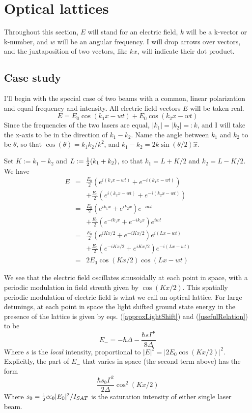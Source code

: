 \documentclass[aps,twocolumn,prb,floatfix,amsmath,amssymb,groupedaddress]{revtex4}
\begin{document}
\section{Optical lattices}
Throughout this section, $E$ will stand for an electric field, $k$ will be a k-vector or k-number, and $w$ will be an angular frequency.  I will drop arrows over vectors, and the juxtaposition of two vectors, like $kx$, will indicate their dot product.

\subsection{Case study}
I'll begin with the special case of two beams with a common, linear polarization and equal frequency and intensity.  All electric field vectors $E$ will be taken real.
\[E = E_0 \cos(k_1x-wt) + E_0 \cos(k_2x-wt)\]
Since the frequencies of the two lasers are equal, $|k_1| = |k_2|=:k$, and I will take the x-axis to be in the direction of $k_1-k_2$.  Name the angle between $k_1$ and $k_2$ to be $\theta$, so that $\cos(\theta) = k_1k_2 / k^2$, and $k_1-k_2 = 2k\sin(\theta/2) \hat{x}$.

Set $K:=k_1-k_2$ and $L:={\frac{1}{2}}(k_1+k_2)$, so that $k_1 = L+K/2$ and $k_2=L-K/2$.  We have
\begin{eqnarray}
E & = & \frac{E_0}{2} \left(e^{i(k_1x-wt)}+e^{-i(k_1x-wt)}\right)  \nonumber\\
& &  + \frac{E_0}{2} \left(e^{i(k_2x-wt)}+e^{-i(k_2x-wt)}\right)  \nonumber\\
& = & \frac{E_0}{2} \left(e^{ik_1x} + e^{ik_2x}\right) e^{-iwt}  \nonumber\\
& & + \frac{E_0}{2} \left(e^{-ik_1x} + e^{-ik_2x}\right)e^{iwt}  \nonumber\\
& = & \frac{E_0}{2} \left(e^{iKx/2} + e^{-iKx/2}\right) e^{i(Lx-wt)}  \nonumber\\
& & + \frac{E_0}{2} \left(e^{-iKx/2} + e^{iKx/2}\right)e^{-i(Lx-wt)}  \nonumber\\
& = & 2E_0\cos(Kx/2)\cos(Lx-wt)
\label{lattice1d}
\end{eqnarray}

We see that the electric field oscillates sinusoidally at each point in space, with a periodic modulation in field strenth given by $\cos(Kx/2)$.  This spatially periodic modulation of electric field is what we call an optical lattice.  For large detunings, at each point in space the light shifted ground state energy in the presence of the lattice is given by eqs. (\ref{approxLightShift}) and (\ref{usefulRelation}) to be
\[E_- = -\hbar\Delta -\frac{\hbar s \Gamma^2}{8\Delta}\]
Where $s$ is the \textit{local} intensity, proportional to $|E|^2 = |2E_0 \cos(Kx/2)|^2$.  Explicitly, the part of $E_-$ that varies in space (the second term above) has the form
\[\frac{\hbar s_0 \Gamma^2}{2\Delta} \cos^2(Kx/2)\]
Where $s_0 = {\frac{1}{2}} c\epsilon_0 |E_0|^2/I_{SAT}$ is the saturation intensity of either single laser beam. 
\end{document}
